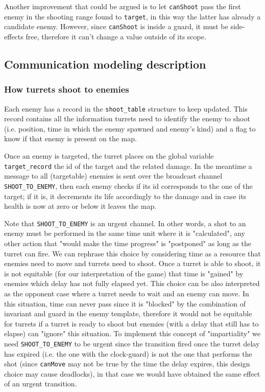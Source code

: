 \documentclass[
10pt, %
a4paper, %
oneside, %
headinclude,footinclude, %
BCOR5mm, %
]{scrartcl}
\begin{document}
				Another improvement that could be argued is to let \texttt{canShoot} pass the first enemy in the shooting range found to \texttt{target}, in this way the latter has already a candidate enemy. However, since \texttt{canShoot} is inside a guard, it must be side-effects free, therefore it can't change a value outside of its scope.
		\subsection{Communication modeling description}
			\subsubsection{How turrets shoot to enemies}
				Each enemy has a record in the \texttt{shoot\_table} structure to keep updated. This record contains all the information turrets need to identify the enemy to shoot (i.e. position, time in which the enemy spawned and enemy's kind) and a flag to know if that enemy is present on the map.
				
				Once an enemy is targeted, the turret places on the global variable \texttt{target\_record} the id of the target and the related damage. In the meantime a message to all (targetable) enemies is sent over the broadcast channel \texttt{SHOOT\_TO\_ENEMY}, then each enemy checks if its id corresponds to the one of the target; if it is, it decrements its life accordingly to the damage and in case its health is now at zero or below it leaves the map.
				
				Note that \texttt{SHOOT\_TO\_ENEMY} is an urgent channel. In other words, a shot to an enemy must be performed in the same time unit where it is "calculated", any other action that "would make the time progress" is "postponed" as long as the turret can fire. We can rephrase this choice by considering time as a resource that enemies need to move and turrets need to shoot. Once a turret is able to shoot, it is not equitable (for our interpretation of the game) that time is "gained" by enemies which delay has not fully elapsed yet. This choice can be also interpreted as the opponent case where a turret needs to wait and an enemy can move. In this situation, time can never pass since it is "blocked" by the combination of invariant and guard in the enemy template, therefore it would not be equitable for turrets if a turret is ready to shoot but enemies (with a delay that still has to elapse) can "ignore" this situation. To implement this concept of "impartiality" we need \texttt{SHOOT\_TO\_ENEMY} to be urgent since the transition fired once the turret delay has expired (i.e. the one with the clock-guard) is not the one that performs the shot (since \texttt{canMove} may not be true by the time the delay expires, this design choice may cause deadlocks), in that case we would have obtained the same effect of an urgent transition.
\end{document}
